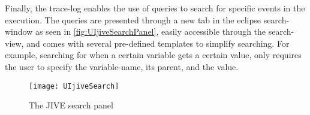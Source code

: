 Finally, the trace-log enables the use of queries to search for specific events in the execution.
The queries are presented through a new tab in the eclipse search-window as seen in \autoref{fig:UIjiveSearchPanel}, easily accessible through the search-view, and comes with several pre-defined templates to simplify searching.
For example, searching for when a certain variable gets a certain value, only requires the user to specify the variable-name, its parent, and the value.
\begin{figure}[H]
	\centering
	\texttt{[image: UIjiveSearch]}
	\caption{The JIVE search panel}
	\label{fig:UIjiveSearchPanel}
\end{figure}
~\\
